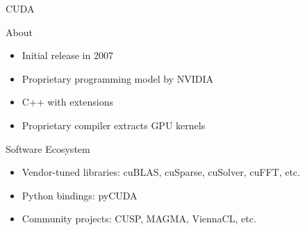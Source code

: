 


\begin{frame}[fragile]{CUDA}
 
 \begin{block}{About}
  \begin{itemize}
   \item Initial release in 2007
   \item Proprietary programming model by NVIDIA
   \item C++ with extensions
   \item Proprietary compiler extracts GPU kernels
  \end{itemize}
 \end{block}

 \begin{block}{Software Ecosystem}
  \begin{itemize}
   \item Vendor-tuned libraries: cuBLAS, cuSparse, cuSolver, cuFFT, etc.
   \item Python bindings: pyCUDA
   \item Community projects: CUSP, MAGMA, ViennaCL, etc.
  \end{itemize}
 \end{block}

\end{frame}


%  
% 
% 
%   
%  
%  
% 
% 
%  
% 
%   
%  
%  
% 
% 

